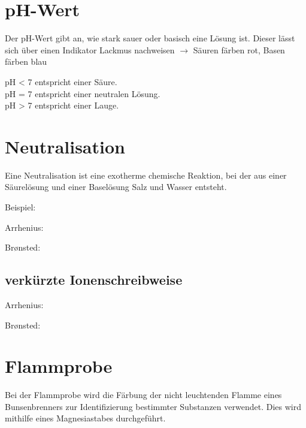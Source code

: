 \section{pH-Wert}
Der pH-Wert gibt an, wie stark sauer oder basisch eine Lösung ist.
Dieser lässt sich über einen Indikator \zB Lackmus nachweisen $\rightarrow$ Säuren färben rot, Basen färben blau

\begin{center}
\end{center}

pH < 7 entspricht einer Säure. \\
pH = 7 entspricht einer neutralen Lösung. \\
pH > 7 entspricht einer Lauge.

\section{Neutralisation}
Eine Neutralisation ist eine exotherme chemische Reaktion, bei der aus einer Säurelösung und einer Baselösung Salz und Wasser entsteht.

Beispiel: 

Arrhenius: 

Brønsted: 

\subsection{verkürzte Ionenschreibweise}
Arrhenius: 

Brønsted: 

\section{Flammprobe}
Bei der Flammprobe wird die Färbung der nicht leuchtenden Flamme eines Bunsenbrenners zur Identifizierung bestimmter Substanzen verwendet. Dies wird mithilfe eines Magnesiastabes durchgeführt.

